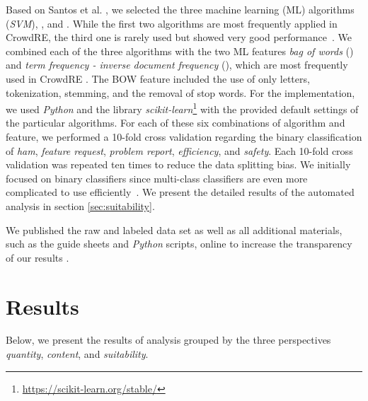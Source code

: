 \documentclass[conference]{IEEEtran}
\begin{document}
{Based on Santos et al. \cite{Santos.2019a}, we selected the three machine learning (ML) algorithms \textit{} (\textit{SVM}), \textit{}, and \textit{}. While the first two algorithms are most frequently applied in CrowdRE, the third one is rarely used but showed very good performance~\cite{Santos.2019a}. We combined each of the three algorithms with the two ML features \textit{bag of words} () and \textit{term frequency - inverse document frequency} (), which are most frequently used in CrowdRE \cite{Santos.2019a}. The BOW feature included the use of only letters, tokenization, stemming, and the removal of stop words. For the implementation, we used \textit{Python} and the library \textit{scikit-learn}\footnote{\url{https://scikit-learn.org/stable/}} with the provided default settings of the particular algorithms. For each of these six combinations of algorithm and feature, we performed a 10-fold cross validation regarding the binary classification of \textit{ham}, \textit{feature request}, \textit{problem report}, \textit{efficiency}, and \textit{safety}. Each 10-fold cross validation was repeated ten times to reduce the data splitting bias. We initially focused on binary classifiers since multi-class classifiers are even more complicated to use efficiently~\cite{Maalej.2015}. We present the detailed results of the automated analysis in section \ref{sec:suitability}.

We published the raw and labeled data set as well as all additional materials, such as the guide sheets and \textit{Python} scripts, online to increase the transparency of our results \cite{Karras.2021}.

\section{Results}
\label{sec:results}
Below, we present the results of analysis grouped by the three perspectives \textit{quantity}, \textit{content}, and \textit{suitability}.

}
\end{document}
